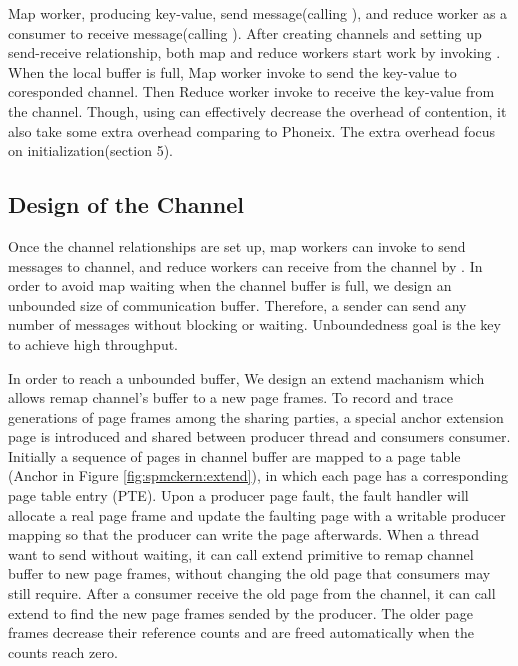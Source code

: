 Map worker, producing key-value, send message(calling ),
and reduce worker as a consumer to receive message(calling ).
After creating channels and setting up send-receive relationship,
both map and reduce workers start work by invoking .
When the local buffer is full, 
Map worker invoke  to send
the key-value to coresponded channel.
Then Reduce worker invoke  to receive
the key-value from the channel. 
Though, using \myth can effectively decrease the overhead of contention,
it also take some extra overhead comparing to Phoneix. 
The extra overhead focus on initialization(section 5). 







\subsection{Design of the Channel}

Once the channel relationships are set up, 
map workers can invoke  to send messages to channel,
and reduce workers can receive from the channel by .
In order to avoid map waiting when the channel buffer is full,
we design an unbounded size of communication buffer.
Therefore, a sender can send any number of messages without blocking or waiting.
Unboundedness goal is the key to achieve high throughput.

In order to reach a unbounded buffer,
We design an extend machanism 
which allows remap channel’s buffer to a new page frames.
To record and trace generations of page frames among the sharing parties, 
a special anchor extension page is introduced and shared between producer thread and consumers consumer.
Initially a sequence of pages in channel buffer 
are mapped to a  page table (Anchor in Figure
\ref{fig:spmckern:extend}), 
in which each page has a corresponding page table entry (PTE).
Upon a producer page fault, the fault handler will allocate a real page frame and update the faulting page with a
writable producer mapping so that the producer can write the
page afterwards.
When a thread want to send without waiting, 
it can call extend primitive to remap channel buffer to new page frames,
without changing the old page 
that consumers may still require. 
After a consumer receive the old page from the channel, 
it can call extend to find the new page frames sended by the
producer.
The older page frames decrease their reference counts and
are freed automatically when the counts reach zero.


